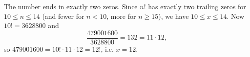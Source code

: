 The number ends in exactly two zeros. Since $n!$ has exactly two trailing zeros for $10\le n\le14$ (and fewer for $n<10$, more for $n\ge15$), we have $10\le x\le14$. Now $10!=3628800$ and
\[\dfrac{479001600}{3628800}=132=11\cdot12,\]
so $479001600=10!\cdot11\cdot12=12!$, i.e. $x=\boxed{12}$.
